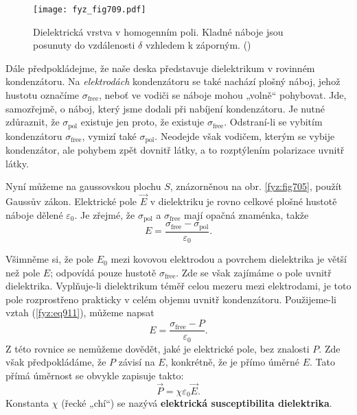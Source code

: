     \begin{figure}[ht!] %
      \centering
      \texttt{[image: fyz\_fig709.pdf]}
      \caption{Dielektrická vrstva v homogenním poli. Kladné náboje jsou posunuty do vzdálenosti
              \(δ\) vzhledem k záporným. (\cite[s.~177]{Feynman02})}
      \label{fyz:fig709}
    \end{figure}
    
    Dále předpokládejme, že naše deska představuje dielektrikum v rovinném kondenzátoru. Na
    \emph{elektrodách} kondenzátoru se také nachází plošný náboj, jehož hustotu označíme
    \(σ_{\text{free}}\), neboť ve vodiči se náboje mohou „volně“ pohybovat. Jde, samozřejmě, o
    náboj, který jsme dodali při nabíjení kondenzátoru. Je nutné zdůraznit, že \(σ_{\text{pol}}\)
    existuje jen proto, že existuje \(σ_{\text{free}}\). Odstraní-li se vybitím kondenzátoru
    \(σ_{\text{free}}\), vymizí také \(σ_{\text{pol}}\). Neodejde však vodičem, kterým se vybije
    kondenzátor, ale pohybem zpět dovnitř látky, a to rozptýlením polarizace uvnitř látky.

    Nyní můžeme na gaussovskou plochu \(S\), znázorněnou na obr. \ref{fyz:fig705}, použít Gaussův
    zákon. Elektrické pole \(\vec{E}\) v dielektriku je rovno celkové plošné hustotě náboje dělené
    \(\varepsilon_0\). Je zřejmé, že \(σ_{\text{pol}}\) a \(σ_{\text{free}}\) mají opačná znaménka,
    takže
    \begin{equation}\label{fyz:eq912}
      E = \dfrac{σ_{\text{free}} - σ_{\text{pol}}}{\varepsilon_0}.
    \end{equation}

    Všimněme si, že pole \(E_0\) mezi kovovou elektrodou a povrchem dielektrika je větší než pole
    \(E\); odpovídá pouze hustotě \(σ_{\text{free}}\). Zde se však zajímáme o pole uvnitř
    dielektrika. Vyplňuje-li dielektrikum téměř celou mezeru mezi elektrodami, je toto pole
    rozprostřeno prakticky v celém objemu uvnitř kondenzátoru. Použijeme-li vztah (\ref{fyz:eq911}),
    můžeme napsat
    \begin{equation}\label{fyz:eq913}
      E = \dfrac{σ_{\text{free}} - P}{\varepsilon_0}.
    \end{equation}
    Z této rovnice se nemůžeme dovědět, jaké je elektrické pole, bez znalosti \(P\). Zde však
    předpokládáme, že \(P\) závisí na \(E\), konkrétně, že je přímo úměrné \(E\). Tato přímá
    úměrnost se obvykle zapisuje takto:
    \begin{equation}\label{fyz:eq914}
      \vec{P}=χ\varepsilon_0\vec{E}.
    \end{equation}
    Konstanta \(χ\) (řecké „chí“) se nazývá \textbf{elektrická susceptibilita dielektrika}.

